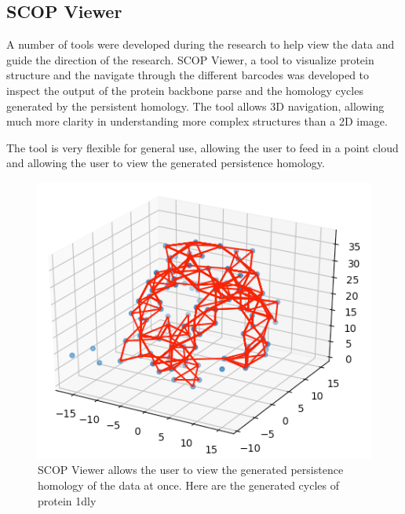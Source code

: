 \documentclass[12pt, a4paper, twocolumn, fullpage]{article}
\theoremstyle{plain}
\theoremstyle{definition}
\theoremstyle{remark}
\begin{document}
\subsection{SCOP Viewer}
A number of tools were developed during the research to help view the data and guide the direction of the research. SCOP Viewer, a tool to visualize protein structure and the navigate through the different barcodes was developed to inspect the output of the protein backbone parse and the homology cycles generated by the persistent homology. The tool allows 3D navigation, allowing much more clarity in understanding more complex structures than a 2D image.

The tool is very flexible for general use, allowing the user to feed in a point cloud and allowing the user to view the generated persistence homology. 

\begin{figure}
    \includegraphics[width=\linewidth]{img/scopviewer/scopviewer1}
    \caption{SCOP Viewer allows the user to view the generated persistence homology of the data at once. Here are the generated cycles of protein 1dly}
    \label{}
\end{figure}
\end{document}
